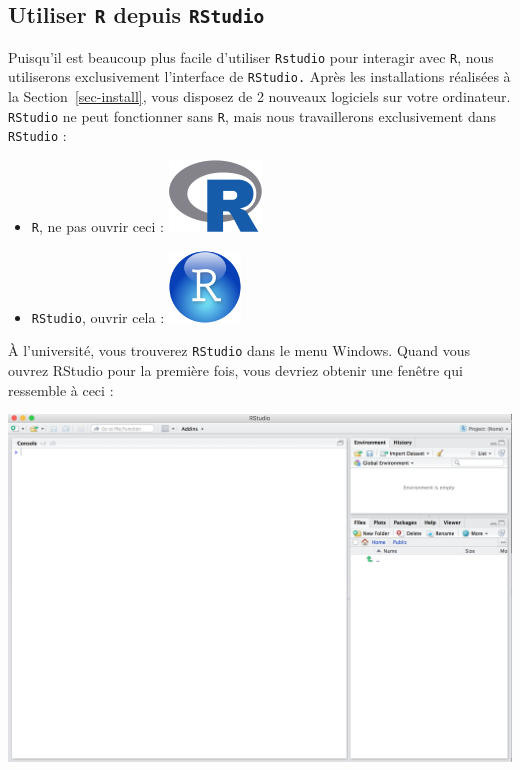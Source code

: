 \documentclass[
  a4paper,
  DIV=11,
  numbers=noendperiod,
  oneside]{scrreprt}
\providecommand{\tightlist}{%
  \setlength{\itemsep}{0pt}\setlength{\parskip}{0pt}}\usepackage{longtable,booktabs,array}
\begin{document}
\subsection{\texorpdfstring{Utiliser \texttt{R} depuis
\texttt{RStudio}}{Utiliser R depuis RStudio}}\label{utiliser-r-depuis-rstudio}

Puisqu'il est beaucoup plus facile d'utiliser \texttt{Rstudio} pour
interagir avec \texttt{R}, nous utiliserons exclusivement l'interface de
\texttt{RStudio.} Après les installations réalisées à la
Section~\ref{sec-install}, vous disposez de 2 nouveaux logiciels sur
votre ordinateur. \texttt{RStudio} ne peut fonctionner sans \texttt{R},
mais nous travaillerons exclusivement dans \texttt{RStudio} :

\begin{itemize}
\tightlist
\item
  \texttt{R}, ne pas ouvrir ceci : \includegraphics{images/Rlogo.png}
\item
  \texttt{RStudio}, ouvrir cela :
  \includegraphics{images/RStudio-Ball.png}
\end{itemize}

À l'université, vous trouverez \texttt{RStudio} dans le menu Windows.
Quand vous ouvrez RStudio pour la première fois, vous devriez obtenir
une fenêtre qui ressemble à ceci :

\includegraphics{images/rstudio.png}
\end{document}
